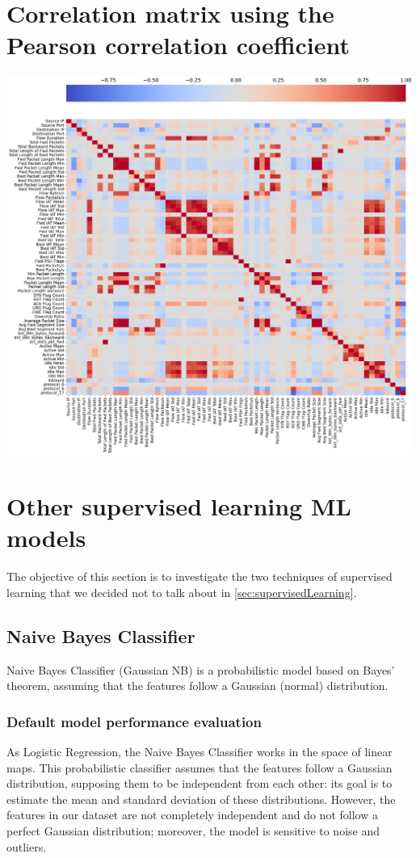 \documentclass[acmlarge,nonacm]{acmart}
\begin{document}
\section{Correlation matrix using the Pearson correlation coefficient} \label{app:correlationMatrix}
\vfill
{\centering 
    \includegraphics[width=1\linewidth]{img/heatmap_correlationMatrix.png}
}
\vfill

\clearpage
\section{Other supervised learning ML models} \label{app:otherModels}
The objective of this section is to investigate the two techniques of supervised learning that we decided not to talk about in \cref{sec:supervisedLearning}.

\subsection{Naive Bayes Classifier}
Naive Bayes Classifier (Gaussian NB) is a probabilistic model based on Bayes’ theorem, assuming that the features follow a Gaussian (normal) distribution.

\subsubsection{Default model performance evaluation} 
As Logistic Regression, the Naive Bayes Classifier works in the space of linear maps. This probabilistic classifier assumes that the features follow a Gaussian distribution, supposing them to be independent from each other: its goal is to estimate the mean and standard deviation of these distributions. However, the features in our dataset are not completely independent and do not follow a perfect Gaussian distribution; moreover, the model is sensitive to noise and outliers. 
\end{document}
